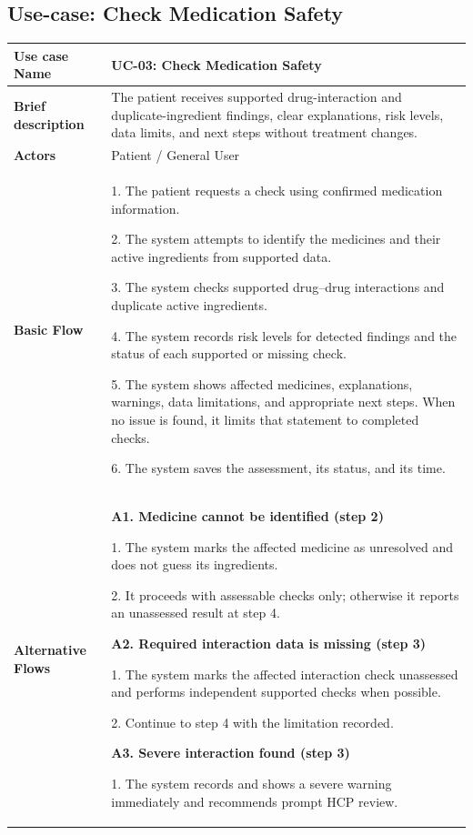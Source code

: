 \subsection{Use-case: Check Medication Safety}
\label{uc:uc-03}
\begin{longtable}{|p{}|p{}|}
\hline
\textbf{Use case Name} & UC-03: Check Medication Safety \\ \hline
\textbf{Brief description} & The patient receives supported drug-interaction and duplicate-ingredient findings, clear explanations, risk levels, data limits, and next steps without treatment changes. \\ \hline
\textbf{Actors} & Patient / General User \\ \hline
\textbf{Basic Flow} &
1. The patient requests a check using confirmed medication information.\par
2. The system attempts to identify the medicines and their active ingredients from supported data.\par
3. The system checks supported drug--drug interactions and duplicate active ingredients.\par
4. The system records risk levels for detected findings and the status of each supported or missing check.\par
5. The system shows affected medicines, explanations, warnings, data limitations, and appropriate next steps. When no issue is found, it limits that statement to completed checks.\par
6. The system saves the assessment, its status, and its time.
\\ \hline
\textbf{Alternative Flows} &
\textbf{A1. Medicine cannot be identified (step 2)}\par
1. The system marks the affected medicine as unresolved and does not guess its ingredients.\par
2. It proceeds with assessable checks only; otherwise it reports an unassessed result at step 4.
\par\smallskip
\textbf{A2. Required interaction data is missing (step 3)}\par
1. The system marks the affected interaction check unassessed and performs independent supported checks when possible.\par
2. Continue to step 4 with the limitation recorded.
\par\smallskip
\textbf{A3. Severe interaction found (step 3)}\par
1. The system records and shows a severe warning immediately and recommends prompt HCP review.\par

\end{longtable}
